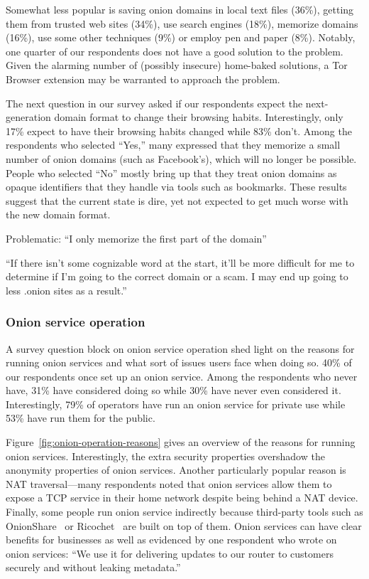 Somewhat less popular is saving onion domains in local text files (36\%),
getting them from trusted web sites (34\%), use search engines (18\%), memorize
domains (16\%), use some other techniques (9\%) or employ pen and paper (8\%).
Notably, one quarter of our respondents does not have a good solution to the
problem.  Given the alarming number of (possibly insecure) home-baked solutions,
a Tor Browser extension may be warranted to approach the problem.

The next question in our survey asked if our respondents expect the
next-generation domain format to change their browsing habits.  Interestingly,
only 17\% expect to have their browsing habits changed while 83\% don't.  Among
the respondents who selected ``Yes,'' many expressed that they memorize a small
number of onion domains (such as Facebook's), which will no longer be possible.
People who selected ``No'' mostly bring up that they treat onion domains as
opaque identifiers that they handle via tools such as bookmarks.  These results
suggest that the current state is dire, yet not expected to get much worse with
the new domain format.

Problematic:
``I only memorize the first part of the domain''

``If there isn't some cognizable word at the start, it'll be more difficult for
me to determine if I'm going to the correct domain or a scam. I may end up going
to less .onion sites as a result.''

\subsubsection{Onion service operation}

A survey question block on onion service operation shed light on the reasons for
running onion services and what sort of issues users face when doing so.  40\%
of our respondents once set up an onion service.  Among the respondents who
never have, 31\% have considered doing so while 30\% have never even considered
it.  Interestingly, 79\% of operators have run an onion service for private use
while 53\% have run them for the public.

Figure~\ref{fig:onion-operation-reasons} gives an overview of the reasons for
running onion services.  Interestingly, the extra security properties overshadow
the anonymity properties of onion services.  Another particularly popular reason
is NAT traversal---many respondents noted that onion services allow them to
expose a TCP service in their home network despite being behind a NAT device.
Finally, some people run onion service indirectly because third-party tools such
as OnionShare~\cite{onionshare} or Ricochet~\cite{ricochet} are built on top of
them.  Onion services can have clear benefits for businesses as well as
evidenced by one respondent who wrote on onion services: ``We use it for
delivering updates to our router to customers securely and without leaking
metadata.''


